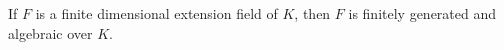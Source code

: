 If $F$ is a finite dimensional extension field of $K$, then $F$ is finitely generated and algebraic over $K$.

